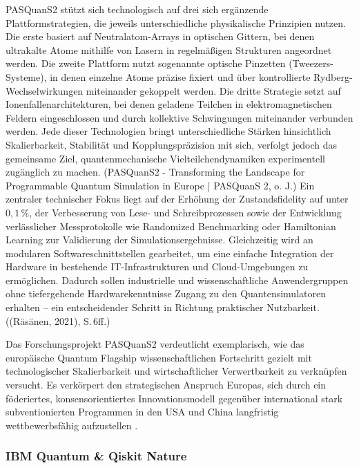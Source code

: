 PASQuanS2 stützt sich technologisch auf drei sich ergänzende Plattformstrategien, die jeweils unterschiedliche physikalische Prinzipien nutzen. Die erste basiert auf Neutralatom-Arrays in optischen Gittern, bei denen ultrakalte Atome mithilfe von Lasern in regelmäßigen Strukturen angeordnet werden. Die zweite Plattform nutzt sogenannte optische Pinzetten (Tweezers-Systeme), in denen einzelne Atome präzise fixiert und über kontrollierte Rydberg-Wechselwirkungen miteinander gekoppelt werden. Die dritte Strategie setzt auf Ionenfallenarchitekturen, bei denen geladene Teilchen in elektromagnetischen Feldern eingeschlossen und durch kollektive Schwingungen miteinander verbunden werden. Jede dieser Technologien bringt unterschiedliche Stärken hinsichtlich Skalierbarkeit, Stabilität und Kopplungspräzision mit sich, verfolgt jedoch das gemeinsame Ziel, quantenmechanische Vielteilchendynamiken experimentell zugänglich zu machen. \cite{}(PASQuanS2 - Transforming the Landscape for Programmable Quantum Simulation in Europe | PASQuanS 2, o. J.) Ein zentraler technischer Fokus liegt auf der Erhöhung der Zustandsfidelity auf unter \(0{,}1\,\%\), der Verbesserung von Lese- und Schreibprozessen sowie der Entwicklung verlässlicher Messprotokolle wie Randomized Benchmarking oder Hamiltonian Learning zur Validierung der Simulationsergebnisse. Gleichzeitig wird an modularen Softwareschnittstellen gearbeitet, um eine einfache Integration der Hardware in bestehende IT-Infrastrukturen und Cloud-Umgebungen zu ermöglichen. Dadurch sollen industrielle und wissenschaftliche Anwendergruppen ohne tiefergehende Hardwarekenntnisse Zugang zu den Quantensimulatoren erhalten – ein entscheidender Schritt in Richtung praktischer Nutzbarkeit. \cite{}((Räsänen, 2021), S. 6ff.)

Das Forschungsprojekt PASQuanS2 verdeutlicht exemplarisch, wie das europäische Quantum Flagship wissenschaftlichen Fortschritt gezielt mit technologischer Skalierbarkeit und wirtschaftlicher Verwertbarkeit zu verknüpfen versucht. Es verkörpert den strategischen Anspruch Europas, sich durch ein föderiertes, konsensorientiertes Innovationsmodell gegenüber international stark subventionierten Programmen in den USA und China langfristig wettbewerbsfähig aufzustellen \citealp[7ff.]{vogiatzoglouEUsQuestDigital2025}.
 

\subsubsection*{IBM Quantum & Qiskit Nature} 

